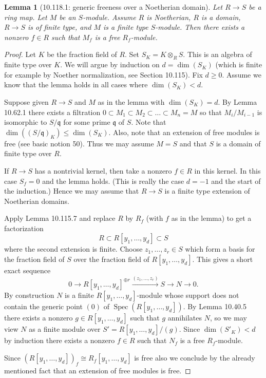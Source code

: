 \documentclass[UTF8,11pt]{ctexart}
\newtheorem*{lemma}{Lemma}
\theoremstyle{definition}
\DeclareMathOperator{\Spec}{Spec}
\begin{document}
\begin{lemma}[10.118.1: generic freeness over a Noetherian domain]
Let $R\to S$ be a ring map. Let $M$ be an $S$-module. Assume $R$ is Noetherian, $R$ is a domain, $R\to S$ is of finite type, and $M$ is a finite type $S$-module. Then there exists a nonzero $f\in R$ such that $M_f$ is a free $R_f$-module.
\end{lemma}
\begin{proof}
Let $K$ be the fraction field of $R$. Set $S_K=K\otimes_RS$. This is an algebra of finite type over $K$. We will argue by induction on $d=\dim(S_K)$ (which is finite for example by Noether normalization, see Section 10.115). Fix $d\geq0$. Assume we know that the lemma holds in all cases where $\dim(S_K)<d$.

Suppose given $R\to S$ and $M$ as in the lemma with $\dim(S_K)=d$. By Lemma 10.62.1 there exists a filtration $0\subset M_1\subset M_2\subset\ldots\subset M_n=M$ so that $M_i/M_{i-1}$ is isomorphic to $S/\mathfrak q$ for some prime $\mathfrak q$ of $S$. Note that $\dim((S/\mathfrak q)_K)\leq\dim(S_K)$. Also, note that an extension of free modules is free (see basic notion 50). Thus we may assume $M=S$ and that $S$ is a domain of finite type over $R$.

If $R\to S$ has a nontrivial kernel, then take a nonzero $f\in R$ in this kernel. In this case $S_f=0$ and the lemma holds. (This is really the case $d=-1$ and the start of the induction.) Hence we may assume that $R\to S$ is a finite type extension of Noetherian domains.

Apply Lemma 10.115.7 and replace $R$ by $R_f$ (with $f$ as in the lemma) to get a factorization
\[R\subset R[y_1,\ldots,y_d]\subset S\]
where the second extension is finite. Choose $z_1,\ldots,z_r\in S$ which form a basis for the fraction field of $S$ over the fraction field of $R[y_1,\ldots,y_d]$. This gives a short exact sequence
\[0\to R[y_1,\ldots,y_d]^{\oplus r}\xrightarrow{(z_1,\ldots,z_r)}S\to N\to0.\]
By construction $N$ is a finite $R[y_1,\ldots,y_d]$-module whose support does not contain the generic point $(0)$ of $\Spec(R[y_1,\ldots,y_d])$. By Lemma 10.40.5 there exists a nonzero $g\in R[y_1,\ldots,y_d]$ such that $g$ annihilates $N$, so we may view $N$ as a finite module over $S'=R[y_1,\ldots,y_d]/(g)$. Since $\dim(S'_K)<d$ by induction there exists a nonzero $f\in R$ such that $N_f$ is a free $R_f$-module.

Since $(R[y_1,\ldots,y_d])_f\cong R_f[y_1,\ldots,y_d]$ is free also we conclude by the already mentioned fact that an extension of free modules is free.
\end{proof}
\end{document}
